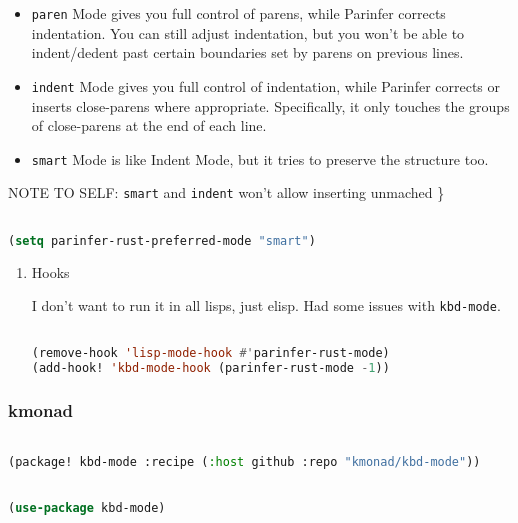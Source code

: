 \documentclass[11pt]{article}
\begin{document}
\begin{itemize}
  \item \texttt{paren} Mode gives you full control of parens, while Parinfer corrects
indentation. You can still adjust indentation, but you won’t be able to
indent/dedent past certain boundaries set by parens on previous lines.
  \item \texttt{indent} Mode gives you full control of indentation, while Parinfer
corrects or inserts close-parens where appropriate. Specifically, it only
touches the groups of close-parens at the end of each line.
  \item \texttt{smart} Mode is like Indent Mode, but it tries to preserve the structure too.
\end{itemize}

NOTE TO SELF: \texttt{smart} and \texttt{indent} won’t allow inserting unmached \}

\begin{lstlisting}[language=Lisp]%! Someone please complete this list for me

(setq parinfer-rust-preferred-mode "smart")
\end{lstlisting}

\begin{enumerate}
  \item Hooks
  \label{sec:hooks}

  I don’t want to run it in all lisps, just elisp. Had some issues with \lstinline|kbd-mode|.

\begin{lstlisting}[language=Lisp]%! Someone please complete this list for me

(remove-hook 'lisp-mode-hook #'parinfer-rust-mode)
(add-hook! 'kbd-mode-hook (parinfer-rust-mode -1))
\end{lstlisting}
\end{enumerate}

\subsubsection{kmonad}
\label{sec:kmonad}
\begin{lstlisting}[language=Lisp]%! Someone please complete this list for me

(package! kbd-mode :recipe (:host github :repo "kmonad/kbd-mode"))
\end{lstlisting}

\begin{lstlisting}[language=Lisp]%! Someone please complete this list for me

(use-package kbd-mode)
\end{lstlisting}
\end{document}
